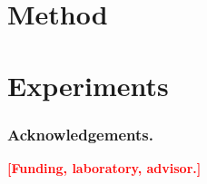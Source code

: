 \documentclass[runningheads]{llncs}
\newcommand{\TODO}[1]{\textcolor{red}{\textbf{[#1]}}}
\begin{document}






\section{Method}
\label{sec:method}




\section{Experiments}
\label{sec:exp}


% 

% 
% 




\subsubsection{Acknowledgements.} \TODO{Funding, laboratory, advisor.}


\end{document}
